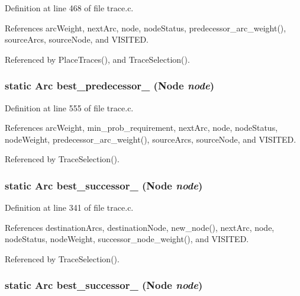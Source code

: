 Definition at line 468 of file trace.c.

References arc\-Weight, next\-Arc, node, node\-Status, predecessor\_\-arc\_\-weight(), source\-Arcs, source\-Node, and VISITED.

Referenced by Place\-Traces(), and Trace\-Selection().
\subsubsection{\setlength{\rightskip}{0pt plus 5cm}static \bf{Arc} best\_\-predecessor\_ (\bf{Node} {\em node})\hspace{0.3cm}{\tt  [static]}}\label{trace_8c_482586ed98c0223423b0f4f8f099f6ff}




Definition at line 555 of file trace.c.

References arc\-Weight, min\_\-prob\_\-requirement, next\-Arc, node, node\-Status, node\-Weight, predecessor\_\-arc\_\-weight(), source\-Arcs, source\-Node, and VISITED.

Referenced by Trace\-Selection().
\subsubsection{\setlength{\rightskip}{0pt plus 5cm}static \bf{Arc} best\_\-successor\_ (\bf{Node} {\em node})\hspace{0.3cm}{\tt  [static]}}\label{trace_8c_24cd028f1137f6ecee616c1541106638}




Definition at line 341 of file trace.c.

References destination\-Arcs, destination\-Node, new\_\-node(), next\-Arc, node, node\-Status, node\-Weight, successor\_\-node\_\-weight(), and VISITED.

Referenced by Trace\-Selection().
\subsubsection{\setlength{\rightskip}{0pt plus 5cm}static \bf{Arc} best\_\-successor\_ (\bf{Node} {\em node})\hspace{0.3cm}{\tt  [static]}}\label{trace_8c_9ddbe7abcba1d1fe581dd6439ab8eff8}




